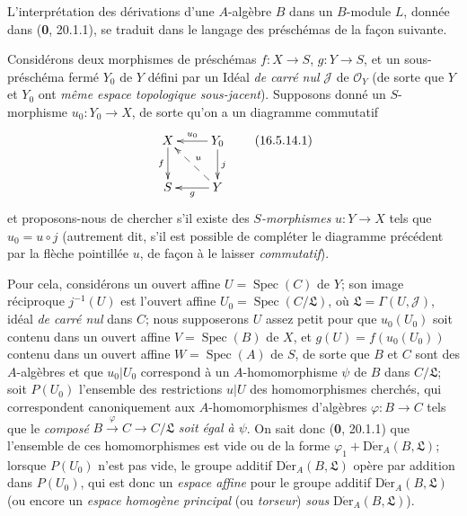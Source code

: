 \begin{env}[16.5.14]
\label{IV.16.5.14}
L'interprétation des dérivations d'une $A$-algèbre $B$ dans un $B$-module
$L$, donnée dans (\textbf{0}, 20.1.1), se traduit dans le langage des préschémas de la
façon suivante.

Considérons deux morphismes de préschémas $f:X\to S$, $g:Y\to S$, et un
sous-préschéma fermé $Y_0$ de $Y$ défini par un Idéal \emph{de carré nul}
$\mathscr{J}$ de $\mathcal{O}_Y$ (de sorte que $Y$ et $Y_0$ ont
\emph{même espace topologique sous-jacent}). Supposons donné un $S$-morphisme
$u_0:Y_0\to X$, de sorte qu'on a un diagramme commutatif
\[
  \xymatrix{
    X\ar[d]_-f & Y_0\ar[l]_-{u_0}\ar[d]^j\\
    S & Y\ar@{-->}[ul]_-u\ar[l]^-g
  }
  \tag{16.5.14.1}
  \label{IV.16.5.14.1}
\]
et proposons-nous de chercher s'il existe des \emph{$S$-morphismes}
$u:Y\to X$ tels que $u_0=u\circ j$ (autrement dit, s'il est possible de
compléter le diagramme précédent par la flèche pointillée $u$, de façon à le
laisser \emph{commutatif}).

Pour cela, considérons un ouvert affine $U=\operatorname{Spec}(C)$ de $Y$;
son image réciproque $j^{-1}(U)$ est l'ouvert affine
$U_0=\operatorname{Spec}(C/\mathfrak{L})$, où
$\mathfrak{L}=\Gamma(U,\mathscr{J})$, idéal \emph{de carré nul} dans $C$;
nous supposerons $U$ assez petit pour que $u_0(U_0)$ soit contenu dans un
ouvert affine $V=\operatorname{Spec}(B)$ de $X$, et
$g(U)=f(u_0(U_0))$ contenu dans un ouvert affine
$W=\operatorname{Spec}(A)$ de $S$, de sorte que $B$ et $C$ sont des
$A$-algèbres et que $u_0|U_0$ correspond à un $A$-homomorphisme $\psi$ de
$B$ dans $C/\mathfrak{L}$; soit $P(U_0)$ l'ensemble des restrictions $u|U$
des homomorphismes cherchés, qui correspondent canoniquement aux
$A$-homomorphismes d'algèbres $\varphi:B\to C$ tels que le \emph{composé}
$B\xrightarrow{\varphi}C\to C/\mathfrak{L}$
\emph{soit égal à $\psi$}. On sait donc (\textbf{0}, 20.1.1) que l'ensemble de ces
homomorphismes est vide ou de la forme
$\varphi_1+\operatorname{D\acute{e}r}_A(B,\mathfrak{L})$; lorsque $P(U_0)$ n'est pas
vide, le groupe additif $\operatorname{D\acute{e}r}_A(B,\mathfrak{L})$ opère par
addition dans $P(U_0)$, qui est donc un \emph{espace affine} pour le groupe
additif $\operatorname{D\acute{e}r}_A(B,\mathfrak{L})$ (ou encore un
\emph{espace homogène principal} (ou \emph{torseur}) \emph{sous}
$\operatorname{D\acute{e}r}_A(B,\mathfrak{L})$).


\end{env}
